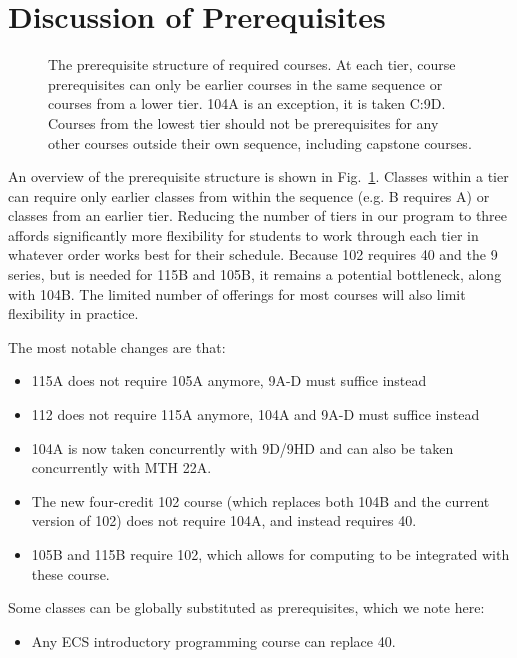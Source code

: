 \documentclass[12pt]{article}
\begin{document}
\section{Discussion of Prerequisites}

\begin{figure}
\begin{center}
\caption{\label{fig:prereqs} The prerequisite structure of required
  courses.  At each tier, course prerequisites can only be earlier
  courses in the same sequence or courses from a lower tier.  104A is
  an exception, it is taken C:9D.  Courses from the lowest tier should
  not be prerequisites for any other courses outside their own
  sequence, including capstone courses.}
\end{center}
\end{figure}

An overview of the prerequisite structure is shown in
Fig.~\ref{fig:prereqs}.  Classes within a tier can require only
earlier classes from within the sequence (e.g. B requires A) or
classes from an earlier tier.  Reducing the number of tiers in our
program to three affords significantly more flexibility for students
to work through each tier in whatever order works best for their
schedule.  Because 102 requires 40 and the 9 series, but is needed for
115B and 105B, it remains a potential bottleneck, along with 104B.
The limited number of offerings for most courses will also limit
flexibility in practice.

The most notable changes are that:
\begin{itemize}
\item 115A does not require 105A anymore, 9A-D must suffice instead
\item 112 does not require 115A anymore, 104A and 9A-D must suffice instead
\item 104A is now taken concurrently with 9D/9HD and can also be taken concurrently with MTH 22A.
\item The new four-credit 102 course (which replaces both 104B and the current version of 102) does not require 104A, and instead requires 40.
\item 105B and 115B require 102, which allows for computing to be integrated with these course. 
\end{itemize}
Some classes can be globally substituted as prerequisites, which we note here:
\begin{itemize}
\item Any ECS introductory programming course can replace 40.
\end{itemize}
\end{document}
